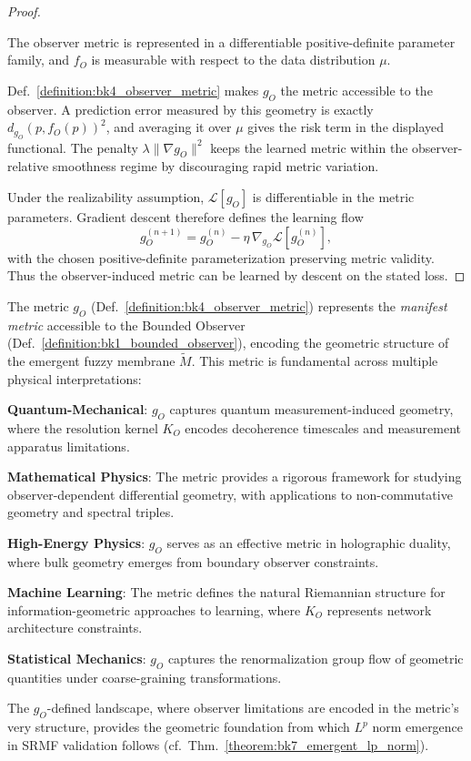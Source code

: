 \begin{proof}
\label{proof:bk4_ml_metric_learning}
\leavevmode

\begin{assumption}
The observer metric is represented in a differentiable positive-definite
parameter family, and $f_O$ is measurable with respect to the data distribution
$\mu$.
\end{assumption}

Def.~\ref{definition:bk4_observer_metric} makes $g_O$ the metric accessible to
the observer. A prediction error measured by this geometry is exactly
$d_{g_O}(p,f_O(p))^2$, and averaging it over $\mu$ gives the risk term in the
displayed functional. The penalty $\lambda\|\nabla g_O\|^2$ keeps the learned
metric within the observer-relative smoothness regime by discouraging rapid
metric variation.

Under the realizability assumption, $\mathcal L[g_O]$ is differentiable in the
metric parameters. Gradient descent therefore defines the learning flow
\[
g_O^{(n+1)}=g_O^{(n)}-\eta\,\nabla_{g_O}\mathcal L[g_O^{(n)}],
\]
with the chosen positive-definite parameterization preserving metric validity.
Thus the observer-induced metric can be learned by descent on the stated loss.
\end{proof}

\begin{scholium}
\label{scholium:bk4_role_of_observer_induced_metric}
The metric $g_O$ (Def.~\ref{definition:bk4_observer_metric}) represents the \textit{manifest metric} accessible to the Bounded Observer (Def.~\ref{definition:bk1_bounded_observer}), encoding the geometric structure of the emergent fuzzy membrane $\tilde{M}$. This metric is fundamental across multiple physical interpretations:

\textbf{Quantum-Mechanical}: $g_O$ captures quantum measurement-induced geometry, where the resolution kernel $K_O$ encodes decoherence timescales and measurement apparatus limitations.

\textbf{Mathematical Physics}: The metric provides a rigorous framework for studying observer-dependent differential geometry, with applications to non-commutative geometry and spectral triples.

\textbf{High-Energy Physics}: $g_O$ serves as an effective metric in holographic duality, where bulk geometry emerges from boundary observer constraints.

\textbf{Machine Learning}: The metric defines the natural Riemannian structure for information-geometric approaches to learning, where $K_O$ represents network architecture constraints.

\textbf{Statistical Mechanics}: $g_O$ captures the renormalization group flow of geometric quantities under coarse-graining transformations.

The $g_O$-defined landscape, where observer limitations are encoded in the metric's very structure, provides the geometric foundation from which $L^p$ norm emergence in SRMF validation follows (cf.~Thm.~\ref{theorem:bk7_emergent_lp_norm}).
\end{scholium}

